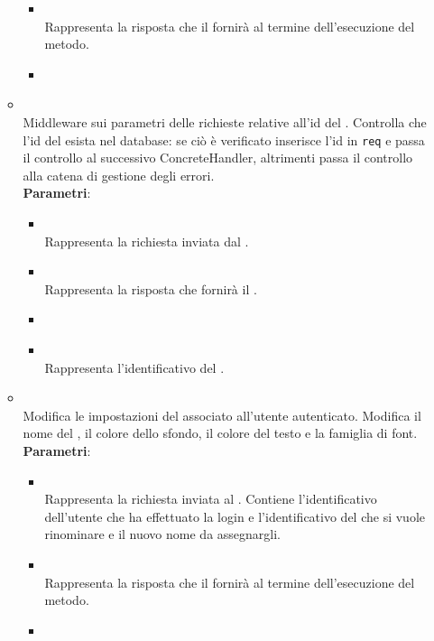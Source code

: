 \begin{itemize}
\begin{itemize}
\begin{itemize}
\item {}
\\ Rappresenta la risposta che il  fornirà al termine dell’esecuzione del metodo.
\item {}
\\ \dpNext
\end{itemize}
\item {}
\\ Middleware sui parametri delle richieste  relative all'id del . Controlla che l'id del  esista nel database: se ciò è verificato inserisce l'id in \texttt{req} e passa il controllo al successivo ConcreteHandler, altrimenti passa il controllo alla catena di gestione degli errori.
\\ \textbf{Parametri}:
\begin{itemize}
\item {}
\\ Rappresenta la richiesta inviata dal .
\item {}
\\ Rappresenta la risposta che fornirà il .
\item {}
\\ \dpNext
\item {}
\\ Rappresenta l'identificativo del .
\end{itemize}
\item {}
\\ Modifica le impostazioni del  associato all'utente autenticato. Modifica il nome del , il colore dello sfondo, il colore del testo e la famiglia di font.
\\ \textbf{Parametri}:
\begin{itemize}
\item {}
\\ Rappresenta la richiesta inviata al . Contiene l’identificativo dell’utente che ha effettuato la login e l’identificativo del  che si vuole rinominare e il nuovo nome da assegnargli.
\item {}
\\ Rappresenta la risposta che il  fornirà al termine dell’esecuzione del metodo.
\item {}
\\ \dpNext
\end{itemize}
\end{itemize}
\end{itemize}
